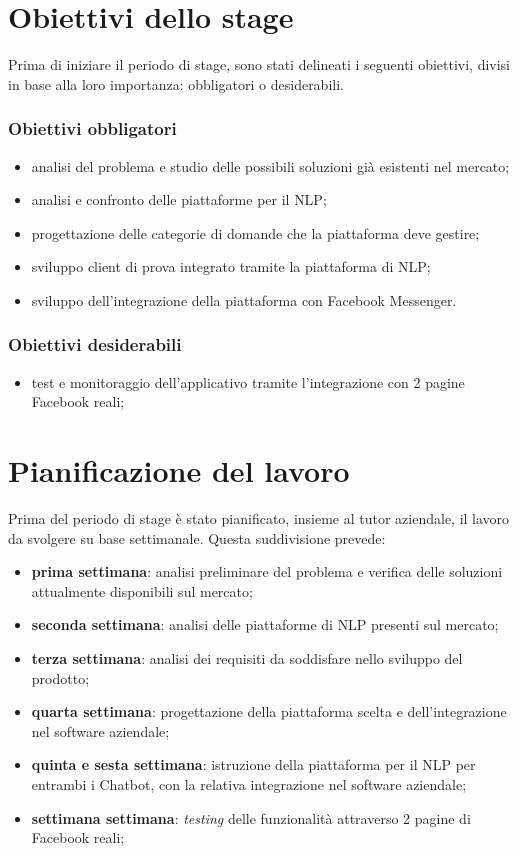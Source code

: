\section{Obiettivi dello stage}
\label{obiettivi}
Prima di iniziare il periodo di stage, sono stati delineati i seguenti obiettivi, divisi in base alla loro importanza: obbligatori o desiderabili.

\subsubsection{Obiettivi obbligatori}
\begin{itemize}
	\item analisi del problema e studio delle possibili soluzioni già esistenti nel mercato;
	\item analisi e confronto delle piattaforme per il \gls{NLP};
	\item progettazione delle categorie di domande che la piattaforma deve gestire;
	\item sviluppo client di prova integrato tramite la piattaforma di \gls{NLP};
	\item sviluppo dell'integrazione della piattaforma con Facebook Messenger.
\end{itemize}

\subsubsection{Obiettivi desiderabili}
\begin{itemize}
	\item test e monitoraggio dell’applicativo tramite l’integrazione con 2 pagine Facebook reali;
\end{itemize}

\section{Pianificazione del lavoro}
Prima del periodo di stage è stato pianificato, insieme al tutor aziendale, il lavoro da svolgere su base settimanale. Questa suddivisione prevede:
\begin{itemize}
	\item \textbf{prima settimana}: analisi preliminare del problema e verifica delle soluzioni attualmente disponibili sul mercato;
	\item \textbf{seconda settimana}: analisi delle piattaforme di \gls{NLP} presenti sul mercato;
	\item \textbf{terza settimana}: analisi dei requisiti da soddisfare nello sviluppo del prodotto;
	\item \textbf{quarta settimana}: progettazione della piattaforma scelta e dell'integrazione nel software aziendale;
	\item \textbf{quinta e sesta settimana}: istruzione della piattaforma per il \gls{NLP} per entrambi i \gls{Chatbot}, con la relativa integrazione nel software aziendale;
	\item \textbf{settimana settimana}: \emph{testing} delle funzionalità attraverso 2 pagine di Facebook reali;
\end{itemize}

